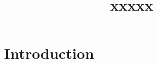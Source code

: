 \documentclass[12pt]{article}
\title{xxxxx}
\begin{document}
\maketitle

\begin{abstract}


\end{abstract}



\maketitle


\section{Introduction}
\end{document}
